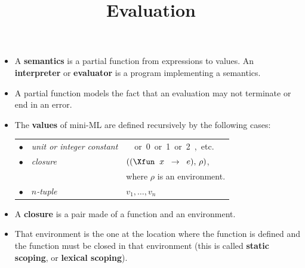 \documentclass[wide]{slides}
\begin{document}
\begin{slide}
  \title{Evaluation}

  \begin{itemize}

    \item A \textbf{semantics} is a partial function from expressions
      to values. An \textbf{interpreter} or \textbf{evaluator} is a
      program implementing a semantics.

    \item A partial function models the fact that an evaluation may
      not terminate or end in an error.

    \item The \textbf{values} of mini-ML are defined recursively by
      the following cases:\\
      \smallskip
      \begin{tabular}{@{\,}r@{\;\;}ll}
        $\bullet$
        & \emph{unit or integer constant}
        & \unit \ or \textsf{0} or \textsf{1} or \textsf{2}, etc.\\
        $\bullet$
        & \emph{closure}
        & $((\Xfun \;\; x \;\; \rightarrow \;\; e), \, \rho)$,\\
        && where $\rho$ is an environment.\\
        $\bullet$
        & \emph{$n$-tuple}
        & $v_1, \dots, v_n$
      \end{tabular}

    \item A \textbf{closure} is a pair made of a function and an
      environment.

    \item That environment is the one at the location where the
      function is defined and the function must be closed in that
      environment (this is called \textbf{static scoping}, or
      \textbf{lexical scoping}).

  \end{itemize}

\end{slide}
\end{document}

